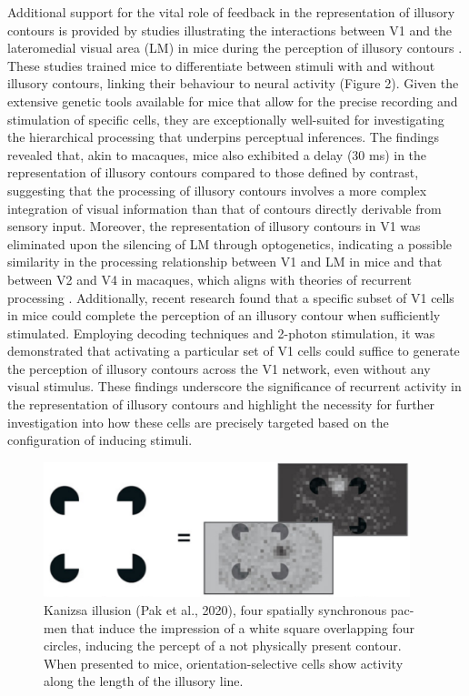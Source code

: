 \documentclass[12pt]{article}
\begin{document}
Additional support for the vital role of feedback in the representation of illusory contours is provided by studies illustrating the interactions between V1 and the lateromedial visual area (LM) in mice during the perception of illusory contours \autocite{pakTopDownFeedbackControls2020}. These studies trained mice to differentiate between stimuli with and without illusory contours, linking their behaviour to neural activity (Figure 2). Given the extensive genetic tools available for mice that allow for the precise recording and stimulation of specific cells, they are exceptionally well-suited for investigating the hierarchical processing that underpins perceptual inferences. The findings revealed that, akin to macaques, mice also exhibited a delay (30 ms) in the representation of illusory contours compared to those defined by contrast, suggesting that the processing of illusory contours involves a more complex integration of visual information than that of contours directly derivable from sensory input. Moreover, the representation of illusory contours in V1 was eliminated upon the silencing of LM through optogenetics, indicating a possible similarity in the processing relationship between V1 and LM in mice and that between V2 and V4 in macaques, which aligns with theories of recurrent processing \autocite{wyatteEarlyRecurrentFeedback2014}. Additionally, recent research \cite{shinRecurrentPatternCompletion2023} found that a specific subset of V1 cells in mice could complete the perception of an illusory contour when sufficiently stimulated. Employing decoding techniques and 2-photon stimulation, it was demonstrated that activating a particular set of V1 cells could suffice to generate the perception of illusory contours across the V1 network, even without any visual stimulus. These findings underscore the significance of recurrent activity in the representation of illusory contours and highlight the necessity for further investigation into how these cells are precisely targeted based on the configuration of inducing stimuli.

\begin{figure}
    \centering
    \includegraphics[width=0.95\textwidth]{figures/Kanizsa_Mice.png}
    \caption{Kanizsa illusion (Pak et al., 2020), four spatially synchronous pac-men that induce the impression of a white square overlapping four circles, inducing the percept of a not physically present contour. When presented to mice, orientation-selective cells show activity along the length of the illusory line.}
    \label{fig:simple_abutting}
\end{figure}
\end{document}
